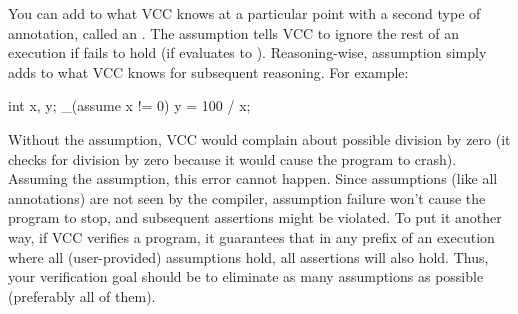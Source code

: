 You can add to what VCC knows at a particular point with a second
type of annotation, called an .
The assumption  tells VCC to ignore
the rest of an execution if  fails to hold (\ie if
 evaluates to ). 
Reasoning-wise, assumption simply adds  to what VCC
knows for subsequent reasoning. For example:
\begin{VCC}
int x, y;
_(assume x != 0)
y = 100 / x;
\end{VCC}
Without the assumption, VCC would complain about possible division by
zero (it checks for division by zero because it would cause the
program to crash).  Assuming the assumption, this error cannot happen.  
Since assumptions (like all annotations) are not seen by the compiler,
assumption failure won't cause the program to stop, and subsequent assertions
might be violated. To put it another way, if VCC verifies a program,
it guarantees that in any prefix of an execution
where all (user-provided) assumptions hold, all assertions will also
hold. Thus, your verification goal should be to eliminate as many assumptions as
possible (preferably all of them).

